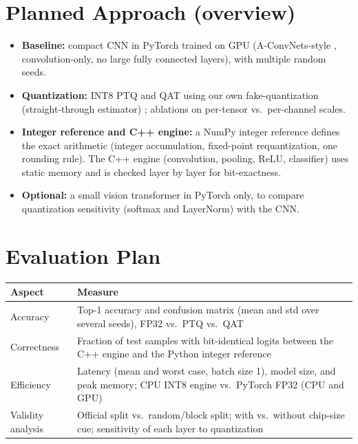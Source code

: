 \documentclass[10pt,letterpaper]{article}
\begin{document}
\section{Planned Approach (overview)}
\begin{itemize}
\item \textbf{Baseline:} compact CNN in PyTorch trained on GPU (A-ConvNets-style \cite{chen}, convolution-only, no large fully connected layers), with multiple random seeds.
\item \textbf{Quantization:} INT8 PTQ and QAT using our own fake-quantization (straight-through estimator) \cite{jacob}; ablations on per-tensor vs.\ per-channel scales.
\item \textbf{Integer reference and C++ engine:} a NumPy integer reference defines the exact arithmetic (integer accumulation, fixed-point requantization, one rounding rule). The C++ engine (convolution, pooling, ReLU, classifier) uses static memory and is checked layer by layer for bit-exactness.
\item \textbf{Optional:} a small vision transformer in PyTorch only, to compare quantization sensitivity (softmax and LayerNorm) with the CNN.
\end{itemize}

\section{Evaluation Plan}
\begin{center}
\small
\begin{tabularx}{\linewidth}{@{}l X@{}}
\toprule
Aspect & Measure \\
\midrule
Accuracy & Top-1 accuracy and confusion matrix (mean and std over several seeds), FP32 vs.\ PTQ vs.\ QAT \\
Correctness & Fraction of test samples with bit-identical logits between the C++ engine and the Python integer reference \\
Efficiency & Latency (mean and worst case, batch size 1), model size, and peak memory; CPU INT8 engine vs.\ PyTorch FP32 (CPU and GPU) \\
Validity analysis & Official split vs.\ random/block split; with vs.\ without chip-size cue; sensitivity of each layer to quantization \\
\bottomrule
\end{tabularx}
\end{center}
\end{document}
